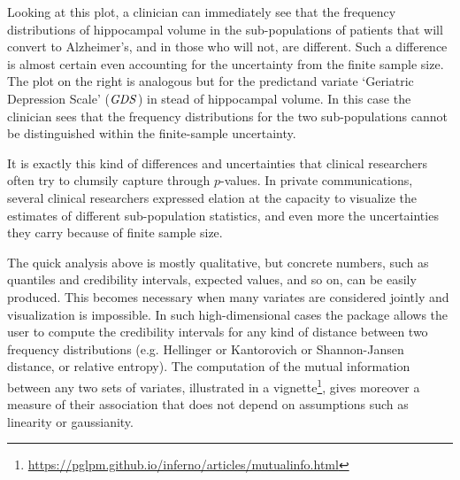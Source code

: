 Looking at this plot, a clinician can immediately see that the frequency distributions of hippocampal volume in the sub-populations of patients that will convert to Alzheimer's, and in those who will not, are different. Such a difference is almost certain even accounting for the uncertainty from the finite sample size. The plot on the right is analogous but for the predictand variate `Geriatric Depression Scale' ($\mathit{GDS}$) in stead of hippocampal volume. In this case the clinician sees that the frequency distributions for the two sub-populations cannot be distinguished within the finite-sample uncertainty.

It is exactly this kind of differences and uncertainties that clinical researchers often try to clumsily capture through $p$-values. In private communications, several clinical researchers expressed elation at the capacity to visualize the estimates of different sub-population statistics, and even more the uncertainties they carry because of finite sample size.

The quick analysis above is mostly qualitative, but concrete numbers, such as quantiles and credibility intervals, expected values, and so on, can be easily produced. This becomes necessary when many variates are considered jointly and visualization is impossible. In such high-dimensional cases the package allows the user to compute the credibility intervals for any kind of distance between two frequency distributions (e.g. Hellinger or Kantorovich or Shannon-Jansen distance, or relative entropy). The computation of the mutual information between any two sets of variates, illustrated in a vignette\footnote{\url{https://pglpm.github.io/inferno/articles/mutualinfo.html}}, gives moreover a measure of their association that does not depend on assumptions such as linearity or gaussianity.

